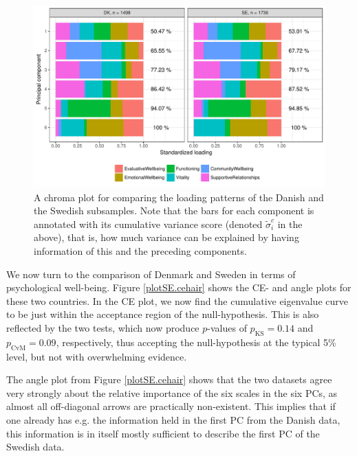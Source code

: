 \documentclass[titlepage,11pt,twoside]{article}
\newcommand{\hl}[1]{\textcolor{magenta}{#1}}
\begin{document}
{\begin{figure}
\center
\includegraphics[scale = 0.7]{essDKSEpancake.pdf}
\caption{A chroma plot for comparing the loading patterns of the Danish and the Swedish subsamples. Note that the bars for each component is annotated with its cumulative variance score (denoted $\tilde\sigma^c_i$ in the above), that is, how much variance can be explained by having information of this and the preceding components.}
\label{plotSE.pancake}
\end{figure}


We now turn to the comparison of Denmark and Sweden in terms of psychological well-being. Figure \ref{plotSE.cehair} shows the CE- and angle plots for these two countries. In the CE plot, we now find the cumulative eigenvalue curve to be just within the acceptance region of the null-hypothesis. This is also reflected by the two tests, which now produce $p$-values of $p_\text{KS} = 0.14$ and $p_\text{CvM} = 0.09$, respectively, thus accepting the null-hypothesis at the typical 5\% level, but not with overwhelming evidence.

The angle plot from Figure \ref{plotSE.cehair} shows that the two datasets agree very strongly about the relative importance of the six scales in the six PCs, as almost all off-diagonal arrows are practically non-existent. This implies that if one already has e.g. the information held in the first PC from the Danish data, this information is in itself mostly sufficient to describe the first PC of the Swedish data.

}
\end{document}
